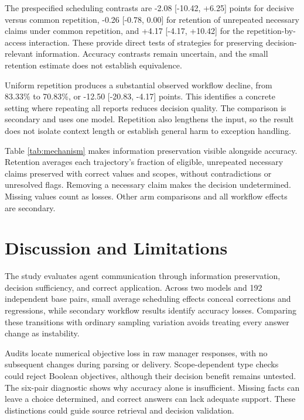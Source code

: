 \documentclass{svproc}
\begin{document}
The prespecified scheduling contrasts are -2.08 [-10.42, +6.25] points for
decisive versus common repetition, -0.26 [-0.78, 0.00] for retention of unrepeated
necessary claims under common repetition, and +4.17 [-4.17, +10.42] for the
repetition-by-access interaction. These provide direct tests of strategies for
preserving decision-relevant information. Accuracy contrasts remain uncertain,
and the small retention estimate does not establish equivalence.

Uniform repetition produces a substantial observed workflow decline, from
83.33\% to 70.83\%, or -12.50 [-20.83, -4.17] points. This identifies a concrete
setting where repeating all reports reduces decision quality. The comparison
is secondary and uses one model. Repetition also lengthens the input, so the
result does not isolate context length or establish general harm to exception
handling.

Table \ref{tab:mechanism} makes information preservation visible alongside
accuracy. Retention averages each trajectory's fraction of eligible, unrepeated
necessary claims preserved with correct values and scopes, without contradictions
or unresolved flags. Removing a necessary claim makes the decision undetermined.
Missing values count as losses. Other arm comparisons and all workflow effects
are secondary.




\section{Discussion and Limitations}
The study evaluates agent communication through information preservation, decision
sufficiency, and correct application. Across two models and 192 independent base
pairs, small average scheduling effects conceal corrections and regressions,
while secondary workflow results identify accuracy losses. Comparing these
transitions with ordinary sampling variation avoids treating every answer
change as instability.

Audits locate numerical objective loss in raw manager responses, with no
subsequent changes during parsing or delivery. Scope-dependent type checks could
reject Boolean objectives, although their decision benefit remains untested.
The six-pair diagnostic shows why accuracy alone is insufficient. Missing facts
can leave a choice determined, and correct answers can lack adequate support.
These distinctions could guide source retrieval and decision validation.
\end{document}
